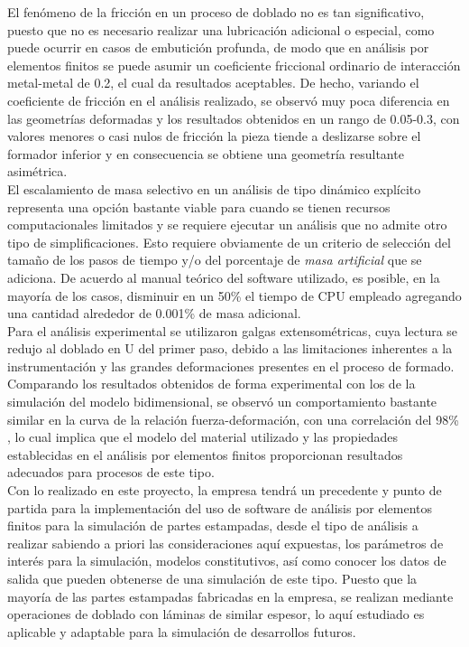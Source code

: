 El fenómeno de la fricción en un proceso de doblado no es tan significativo, puesto que no 
es necesario realizar una lubricación adicional o especial, como puede ocurrir en casos 
de embutición profunda, de modo que en análisis por elementos finitos se puede asumir 
un coeficiente friccional ordinario de interacción metal-metal de 0.2, el cual da resultados 
aceptables. De hecho, variando el coeficiente de fricción en el análisis realizado, se observó 
muy poca diferencia en las geometrías deformadas y los resultados obtenidos en un rango de 0.05-0.3, 
con valores menores o casi nulos de fricción la pieza tiende a deslizarse sobre el formador 
inferior y en consecuencia se obtiene una geometría resultante asimétrica.\\

El escalamiento de masa selectivo en un análisis de tipo dinámico explícito representa una 
opción bastante viable para cuando se tienen recursos computacionales limitados y se 
requiere ejecutar un análisis que no admite otro tipo de simplificaciones. Esto requiere 
obviamente de un criterio de selección del tamaño de los pasos de tiempo y/o del porcentaje 
de \textit{masa artificial} que se adiciona. De acuerdo al manual teórico del software 
utilizado, es posible, en la mayoría de los casos, disminuir en un 50\% el tiempo de CPU 
empleado agregando una cantidad alrededor de 0.001\% de masa adicional.\\

Para el análisis experimental se utilizaron galgas extensométricas, cuya lectura se redujo  
al doblado en U del primer paso, debido a las limitaciones inherentes a la instrumentación y las 
grandes deformaciones presentes en el proceso de formado. Comparando los resultados obtenidos 
de forma experimental con los de la simulación del modelo bidimensional, se observó un comportamiento 
bastante similar en la curva de la relación fuerza-deformación, con una correlación del 98\% , 
lo cual implica que el modelo del material utilizado y las propiedades establecidas en el análisis 
por elementos finitos proporcionan resultados adecuados para procesos de este tipo.  \\

Con lo realizado en este proyecto, la empresa tendrá un precedente y punto de partida para la 
implementación del uso de software de análisis por elementos finitos para la simulación de 
partes estampadas, desde el tipo de análisis a realizar sabiendo a priori las consideraciones aquí 
expuestas, los parámetros de interés para la simulación, modelos constitutivos, así como 
conocer los datos de salida que pueden obtenerse de una simulación de este tipo. Puesto que la 
mayoría de las partes estampadas fabricadas en la empresa, se realizan mediante operaciones de 
doblado con láminas de similar espesor, lo aquí estudiado es aplicable y adaptable para 
la simulación de desarrollos futuros.